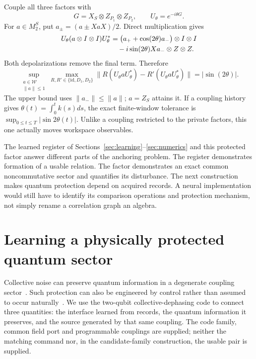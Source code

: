 \documentclass[11pt]{article}
\theoremstyle{definition}
\theoremstyle{remark}
\newcommand{\id}{\mathrm{id}}
\newcommand{\W}{\mathcal W}
\begin{document}
Couple all three factors with
\begin{equation}
 G=X_S\otimes Z_{P_1}\otimes Z_{P_2},\qquad
 U_\theta=e^{-i\theta G}.
\end{equation}
For $a\in M_2^S$, put $a_\pm=(a\pm XaX)/2$. Direct multiplication gives
\begin{align}
 U_\theta(a\otimes I\otimes I)U_\theta^*
 &=\bigl(a_++\cos(2\theta)a_-\bigr)\otimes I\otimes I\notag\\
 &\quad-i\sin(2\theta)Xa_-\otimes Z\otimes Z.
\end{align}
Both depolarizations remove the final term. Therefore
\begin{equation}
 \sup_{\substack{a\in\W\\\|a\|\le1}}
 \max_{R,R'\in\{\id,D_1,D_2\}}
 \|R(U_\theta aU_\theta^*)-R'(U_\theta aU_\theta^*)\|
 =|\sin(2\theta)|.
 \label{eq:tolerance}
\end{equation}
The upper bound uses $\|a_-\|\le\|a\|$; $a=Z_S$ attains it. If a coupling history gives $\theta(t)=\int_0^t k(s)ds$, the exact finite-window tolerance is $\sup_{0\le t\le T}|\sin2\theta(t)|$. Unlike a coupling restricted to the private factors, this one actually moves workspace observables.

The learned register of Sections~\ref{sec:learning}--\ref{sec:numerics} and this protected factor answer different parts of the anchoring problem. The register demonstrates formation of a usable relation. The factor demonstrates an exact common noncommutative sector and quantifies its disturbance. The next construction makes quantum protection depend on acquired records. A neural implementation would still have to identify its comparison operations and protection mechanism, not simply rename a correlation graph an algebra.

\section{Learning a physically protected quantum sector}
\label{sec:quantum_learning}

Collective noise can preserve quantum information in a degenerate coupling
sector~\cite{ZanardiRasetti1997}. Such protection can also be engineered by
control rather than assumed to occur naturally~\cite{Quiroz2024}.
We use the two-qubit collective-dephasing code to connect three quantities:
the interface learned from records, the quantum information it preserves,
and the source generated by that same coupling. The code family, common field
port and programmable couplings are supplied; neither the matching command
nor, in the candidate-family construction, the usable pair is supplied.
\end{document}
